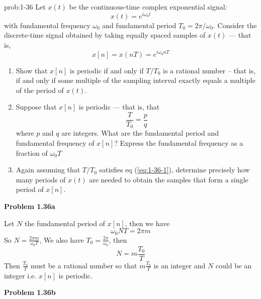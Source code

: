 \documentclass[koma,a4paper,utopia,12pt,listings-color,microtype,paralist,colorlinks,urlcolor=red]{org-article}
\begin{document}
\begin{prob}[]{prob:1-36}
Let \(x(t)\) be the continuous-time complex exponential signal:
\begin{equation*}
x(t) = e^{i\omega_{0}t}
\end{equation*}
with fundamental frequency \(\omega_{0}\) and fundamental period \(T_{0} =
    2\pi /\omega_{0}\). Consider the discrete-time signal obtained by taking
equally spaced samples of \(x(t)\) --- that is,
\begin{equation*}
x[n] = x(nT) = e^{i\omega_{0}nT}
\end{equation*}

\begin{enumerate}
\item Show that \(x[n]\) is periodic if and only if \(T/T_{0}\) is a rational
number -- that is, if and only if some multiple of the sampling interval
exactly equals a multiple of the period of \(x(t)\).
\item Suppose that \(x[n]\) is periodic --- that is, that
\begin{equation}
\label{eq:1-36-1}
\frac{T}{T_{0}} = \frac{p}{q}
\end{equation}
where \(p\) and \(q\) are integers. What are the fundamental period and
fundamental frequency of \(x[n]\)? Express the fundamental frequency as a
fraction of \(\omega_{0}T\)
\item Again assuming that \(T/T_{0}\) satisfies eq (\ref{eq:1-36-1}), determine
precisely how many periods of \(x(t)\) are needed to obtain the samples
that form a single period of \(x[n]\).
\end{enumerate}
\label{prob:1-36}
\end{prob}

\textbf{Problem 1.36a}

\begin{prf}[]{}
Let \(N\) the fundamental period of \(x[n]\), then we have
\begin{equation*}
\omega_{0} N T = 2\pi m
\end{equation*}
So \(N = \frac{2\pi m}{\omega_{0}T}\), We also have \(T_{0}=
\frac{2\pi}{\omega_{0}}\), then
\begin{equation*}
N = m\frac{T_{0}}{T}
\end{equation*}
Then \(\frac{T_{0}}{T}\) must be a rational number so that \(m\frac{T_{0}}{T}\)
is an integer and \(N\) could be an integer i.e. \(x[n]\) is periodic.
\end{prf}

\textbf{Problem 1.36b}
\end{document}
